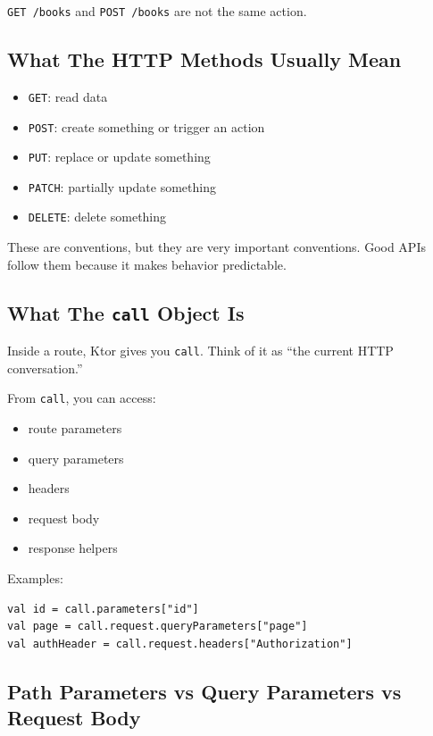\documentclass[11pt,a4paper]{article}
\begin{document}
\texttt{GET /books} and \texttt{POST /books} are not the same action.

\subsection{What The HTTP Methods Usually Mean}

\begin{itemize}
    \item \texttt{GET}: read data
    \item \texttt{POST}: create something or trigger an action
    \item \texttt{PUT}: replace or update something
    \item \texttt{PATCH}: partially update something
    \item \texttt{DELETE}: delete something
\end{itemize}

These are conventions, but they are very important conventions. Good APIs follow them because it makes behavior predictable.

\subsection{What The \texttt{call} Object Is}

Inside a route, Ktor gives you \texttt{call}. Think of it as ``the current HTTP conversation.''

From \texttt{call}, you can access:
\begin{itemize}
    \item route parameters
    \item query parameters
    \item headers
    \item request body
    \item response helpers
\end{itemize}

Examples:

\begin{lstlisting}[style=kazekotlin]
val id = call.parameters["id"]
val page = call.request.queryParameters["page"]
val authHeader = call.request.headers["Authorization"]
\end{lstlisting}

\subsection{Path Parameters vs Query Parameters vs Request Body}
\end{document}
